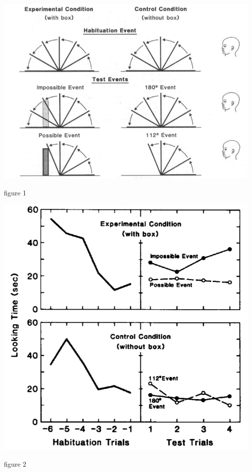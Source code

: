 \documentclass[12pt]{extarticle}
\begin{document}
\begin{multicols}{3}
\begin{center}
\includegraphics[scale=0.25]{img/baillargeon_1987_fig1.neg.png}
\end{center}
\begin{center} \citealp{baillargeon:1987_object} figure 1 \end{center}

\begin{center}
\includegraphics[scale=0.25]{img/baillargeon_1987_fig2.neg.png}
\end{center}
\begin{center} \citealp{baillargeon:1987_object} figure 2 \end{center}


\end{multicols}
\end{document}

